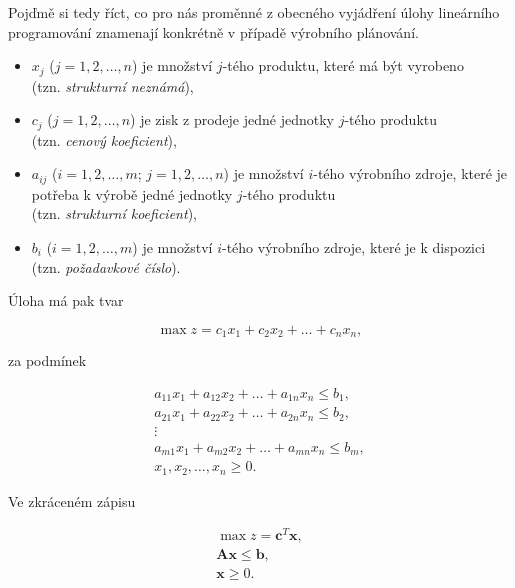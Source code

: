 Pojďmě si tedy říct, co pro nás proměnné z obecného vyjádření úlohy lineárního programování znamenají konkrétně v případě výrobního plánování.

\begin{itemize}[label={}]
    \item $x_j$ ($j = 1, 2, \ldots, n$) je množství $j$-tého produktu, které má být vyrobeno \\(tzn. \textit{strukturní neznámá}),
    \item $c_j$ ($j = 1, 2, \ldots, n$) je zisk z prodeje jedné jednotky $j$-tého produktu \\(tzn. \textit{cenový koeficient}),
    \item $a_{ij}$ ($i = 1, 2, \ldots, m$; $j = 1, 2, \ldots, n$) je množství $i$-tého výrobního zdroje, které je potřeba k výrobě jedné jednotky $j$-tého produktu \\(tzn. \textit{strukturní koeficient}),
    \item $b_i$ ($i = 1, 2, \ldots, m$) je množství $i$-tého výrobního zdroje, které je k dispozici \\(tzn. \textit{požadavkové číslo}).
\end{itemize}

Úloha má pak tvar

\begin{equation}
        \max z = c_1x_1 + c_2x_2 + \ldots + c_nx_n,
\end{equation}

za podmínek

\begin{equation}
    \begin{gathered}
        a_{11}x_1 + a_{12}x_2 + \ldots + a_{1n}x_n \leq b_1, \\
        a_{21}x_1 + a_{22}x_2 + \ldots + a_{2n}x_n \leq b_2, \\
        \vdots \\
        a_{m1}x_1 + a_{m2}x_2 + \ldots + a_{mn}x_n \leq b_m, \\
        x_1, x_2, \ldots, x_n \geq 0.
    \end{gathered}
\end{equation}

Ve zkráceném zápisu

\begin{equation}
    \begin{gathered}
        \max z = \bm{c}^T\bm{x}, \\
        \bm{A}\bm{x} \leq \bm{b}, \\
        \bm{x} \geq 0.
    \end{gathered}
\end{equation}

